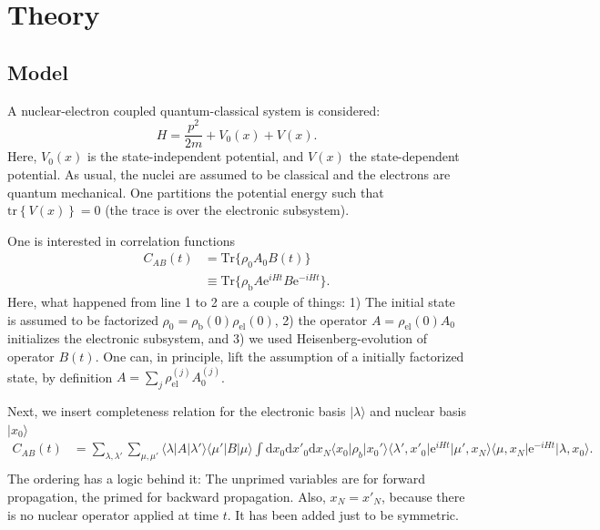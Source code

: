 \documentclass{article}
\newcommand{\exP}[1]{\mathrm{e}^{#1}}
\newcommand{\dif}{\mathrm{d}}
\newcommand{\tr}[1]{\mathrm{tr}\left\{#1\right\}}
\begin{document}
\section{Theory}
\subsection{Model}
A nuclear-electron coupled quantum-classical system is considered:
\begin{equation}
	H = \frac{p^2}{2m} + V_0(x) + V(x).
\end{equation}
Here, $V_0(x)$ is the state-independent potential, and $V(x)$ the state-dependent potential. As usual, the nuclei are assumed to be classical and the electrons are quantum mechanical.
One partitions the potential energy such that $\tr{V(x)}=0$ (the trace is over the electronic subsystem).

One is interested in correlation functions
\begin{align}
	C_{AB}(t) &= \mathrm{Tr}\{\rho_0 A_0B(t)\}\\
	&\equiv \mathrm{Tr}\{\rho_\mathrm{b} A\exP{iHt}B\exP{-iHt}\}.
\end{align}
Here, what happened from line 1 to 2 are a couple of things: 1) The initial state is assumed to be factorized $\rho_0 = \rho_\mathrm{b}(0) \rho_\mathrm{el}(0)$, 2) the operator $A=\rho_\mathrm{el}(0)A_0$ initializes the electronic subsystem, and 3) we used Heisenberg-evolution of operator $B(t)$. One can, in principle, lift the assumption of a initially factorized state, by definition $A = \sum_j \rho_\mathrm{el}^{(j)}A^{(j)}_0$.

Next, we insert completeness relation for the electronic basis $\vert \lambda\rangle$ and nuclear basis $\vert x_0 \rangle $
\begin{align}
	C_{AB}(t) &= \sum_{\lambda,\lambda'}\sum_{\mu,\mu'} \langle \lambda \vert A\vert \lambda'\rangle\langle \mu'\vert B\vert \mu\rangle \int \dif x_0 \dif x'_0 \dif x_N \langle x_0 \vert \rho_b \vert x_0'\rangle \langle \lambda',x'_0\vert \exP{iHt}\vert \mu',x_N\rangle\langle \mu,x_N\vert \exP{-iHt}\vert \lambda,x_0\rangle.\\
\end{align}
The ordering has a logic behind it: The unprimed variables are for forward propagation, the primed for backward propagation. Also, $x_N=x'_N$, because there is no nuclear operator applied at time $t$. It has been added just to be symmetric.
\end{document}
